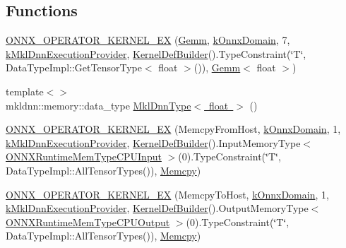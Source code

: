 \subsection*{Functions}
\begin{DoxyCompactItemize}
\item 
\mbox{\hyperlink{namespaceonnxruntime_1_1mkl__dnn_a2ed5c455d116804677e39a7151f6ff94}{O\+N\+N\+X\+\_\+\+O\+P\+E\+R\+A\+T\+O\+R\+\_\+\+K\+E\+R\+N\+E\+L\+\_\+\+EX}} (\mbox{\hyperlink{classonnxruntime_1_1mkl__dnn_1_1Gemm}{Gemm}}, \mbox{\hyperlink{namespaceonnxruntime_ac0e7c0c106a2c9e9594560a3ab289fa0}{k\+Onnx\+Domain}}, 7, \mbox{\hyperlink{namespaceonnxruntime_abd1901c951bcb5845eeeaff9dd75ce97}{k\+Mkl\+Dnn\+Execution\+Provider}}, \mbox{\hyperlink{classonnxruntime_1_1KernelDefBuilder}{Kernel\+Def\+Builder}}().Type\+Constraint(\char`\"{}T\char`\"{}, Data\+Type\+Impl\+::\+Get\+Tensor\+Type$<$ float $>$()), \mbox{\hyperlink{classonnxruntime_1_1mkl__dnn_1_1Gemm}{Gemm}}$<$ float $>$)
\item 
{\footnotesize template$<$$>$ }\\mkldnn\+::memory\+::data\+\_\+type \mbox{\hyperlink{namespaceonnxruntime_1_1mkl__dnn_a5a41bb967ee21f40cc3e87c22b304a07}{Mkl\+Dnn\+Type$<$ float $>$}} ()
\item 
\mbox{\hyperlink{namespaceonnxruntime_1_1mkl__dnn_a305d1082bc73119bd7c21286ec6e168b}{O\+N\+N\+X\+\_\+\+O\+P\+E\+R\+A\+T\+O\+R\+\_\+\+K\+E\+R\+N\+E\+L\+\_\+\+EX}} (Memcpy\+From\+Host, \mbox{\hyperlink{namespaceonnxruntime_ac0e7c0c106a2c9e9594560a3ab289fa0}{k\+Onnx\+Domain}}, 1, \mbox{\hyperlink{namespaceonnxruntime_abd1901c951bcb5845eeeaff9dd75ce97}{k\+Mkl\+Dnn\+Execution\+Provider}}, \mbox{\hyperlink{classonnxruntime_1_1KernelDefBuilder}{Kernel\+Def\+Builder}}().Input\+Memory\+Type$<$ \mbox{\hyperlink{allocator__info_8h_add3f8ee3ff93395704abae71c30cab18a3127507f1d160fd6348370cc7bd42245}{O\+N\+N\+X\+Runtime\+Mem\+Type\+C\+P\+U\+Input}} $>$(0).Type\+Constraint(\char`\"{}T\char`\"{}, Data\+Type\+Impl\+::\+All\+Tensor\+Types()), \mbox{\hyperlink{classonnxruntime_1_1Memcpy}{Memcpy}})
\item 
\mbox{\hyperlink{namespaceonnxruntime_1_1mkl__dnn_a1dc167a0cc3f84edb27714a0ade12b45}{O\+N\+N\+X\+\_\+\+O\+P\+E\+R\+A\+T\+O\+R\+\_\+\+K\+E\+R\+N\+E\+L\+\_\+\+EX}} (Memcpy\+To\+Host, \mbox{\hyperlink{namespaceonnxruntime_ac0e7c0c106a2c9e9594560a3ab289fa0}{k\+Onnx\+Domain}}, 1, \mbox{\hyperlink{namespaceonnxruntime_abd1901c951bcb5845eeeaff9dd75ce97}{k\+Mkl\+Dnn\+Execution\+Provider}}, \mbox{\hyperlink{classonnxruntime_1_1KernelDefBuilder}{Kernel\+Def\+Builder}}().Output\+Memory\+Type$<$ \mbox{\hyperlink{allocator__info_8h_add3f8ee3ff93395704abae71c30cab18a59888d12290735245a1b8afb40f64331}{O\+N\+N\+X\+Runtime\+Mem\+Type\+C\+P\+U\+Output}} $>$(0).Type\+Constraint(\char`\"{}T\char`\"{}, Data\+Type\+Impl\+::\+All\+Tensor\+Types()), \mbox{\hyperlink{classonnxruntime_1_1Memcpy}{Memcpy}})

\end{DoxyCompactItemize}
